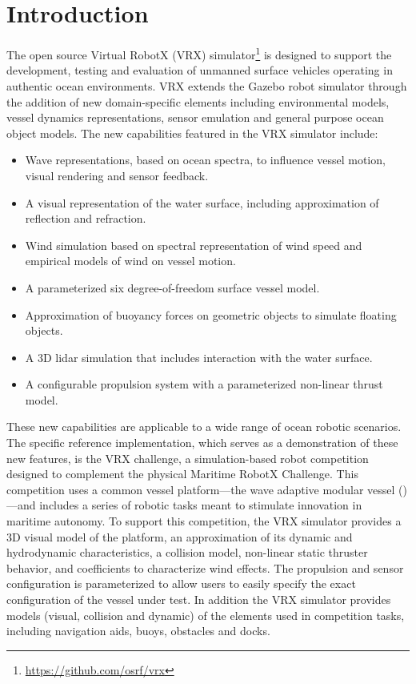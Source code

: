 \documentclass[utf8]{frontiersSCNS} %
\begin{document}
\section{Introduction}
The open source Virtual RobotX (VRX) simulator\footnote{\url{https://github.com/osrf/vrx}} is designed to support the development, testing and evaluation of unmanned surface vehicles operating in authentic ocean environments.  VRX extends the Gazebo robot simulator through the addition of new domain-specific elements including environmental models, vessel dynamics representations, sensor emulation and general purpose ocean object models.  The new capabilities featured in the VRX simulator include:
\begin{itemize}
\item Wave representations, based on ocean spectra, to influence vessel motion, visual rendering and sensor feedback.
\item A visual representation of the water surface, including approximation of reflection and refraction.
\item Wind simulation based on spectral representation of wind speed and empirical models of wind on vessel motion.
\item A parameterized six degree-of-freedom surface vessel model.
\item Approximation of buoyancy forces on geometric objects to simulate floating objects.
\item A 3D lidar simulation that includes interaction with the water surface.
\item A configurable propulsion system with a parameterized non-linear thrust model.
\end{itemize}

These new capabilities are applicable to a wide range of ocean robotic scenarios.  The specific reference implementation, which serves as a demonstration of these new features, is the VRX challenge, a simulation-based robot competition designed to complement the physical Maritime RobotX Challenge.  This competition uses a common vessel platform---the wave adaptive modular vessel (\wamv{})---and includes a series of robotic tasks meant to stimulate innovation in maritime autonomy.  To support this competition, the VRX simulator provides a 3D visual model of the \wamv{} platform, an approximation of its dynamic and hydrodynamic characteristics, a collision model, non-linear static thruster behavior, and coefficients to characterize wind effects.   The propulsion and sensor configuration is parameterized to allow users to easily specify the exact configuration of the vessel under test.  In addition the VRX simulator provides models (visual, collision and dynamic) of the elements used in competition tasks, including navigation aids, buoys, obstacles and docks.  
\end{document}
